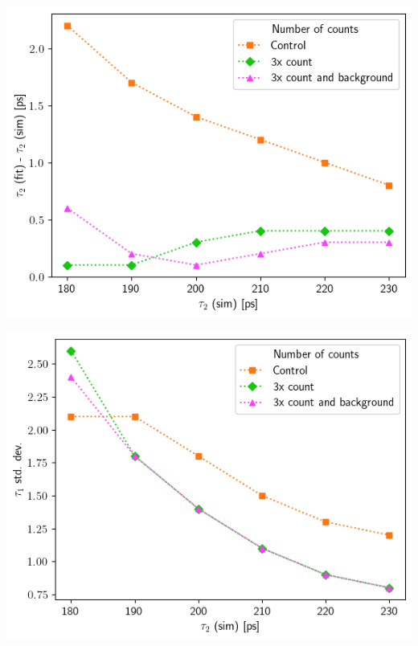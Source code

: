 {\begin{minipage}{ .47\linewidth}
    \includegraphics[width=\linewidth]{Batch 5/t2-diff 2080.png}
    \label{fig:compcount-t2-2080}
\end{minipage}
\hfill
\begin{minipage}{ .47\linewidth}
    \includegraphics[width=\linewidth]{Batch 5/t2-err 2080.png}
    \label{fig:compcountf-t2err-2080}
\end{minipage}
\begin{minipage}{ .47\linewidth}

\end{minipage}}

